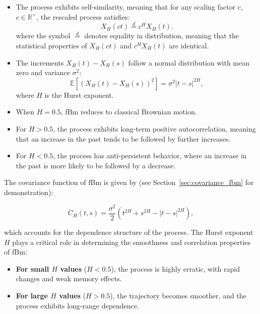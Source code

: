 \documentclass[11pt]{extarticle}
\begin{document}
\begin{itemize}
    \item The process exhibits self-similarity, meaning that for any scaling factor \( c \), \( c \in \mathbb{R}^+ \), the rescaled process satisfies:
    \begin{equation}
        X_H(ct) \overset{d}{=} c^H X_H(t).
    \end{equation}
    where the symbol \(\stackrel{d}{=}\) denotes equality in distribution, meaning that the statistical properties of \(X_H(ct)\) and \(c^H X_H(t)\) are identical.

    \item The increments \( X_H(t) - X_H(s) \) follow a normal distribution with mean zero and variance \( \sigma^2 \):
    \begin{equation}
        \mathbb{E} \left[ (X_H(t) - X_H(s))^2 \right] = \sigma^2|t - s|^{2H},
    \end{equation}
    where \( H \) is the Hurst exponent.

    \item When \( H = 0.5 \), fBm reduces to classical Brownian motion.
    \item For \( H > 0.5 \), the process exhibits long-term positive autocorrelation, meaning that an increase in the past tends to be followed by further increases.
    \item For \( H < 0.5 \), the process has anti-persistent behavior, where an increase in the past is more likely to be followed by a decrease.
\end{itemize}

The covariance function of fBm is given by (see Section~\ref{sec:covariance_fbm} for demonstration):

\begin{equation}
    C_H(t, s) = \frac{\sigma^2}{2} \left( t^{2H} + s^{2H} - |t - s|^{2H} \right),
    \label{eq:fbm_covariance}
\end{equation}

which accounts for the dependence structure of the process. The Hurst exponent \( H \) plays a critical role in determining the smoothness and correlation properties of fBm:

\begin{itemize}
    \item \textbf{For small \( H \) values} (\( H < 0.5 \)), the process is highly erratic, with rapid changes and weak memory effects.
    \item \textbf{For large \( H \) values} (\( H > 0.5 \)), the trajectory becomes smoother, and the process exhibits long-range dependence.
\end{itemize}
\end{document}
